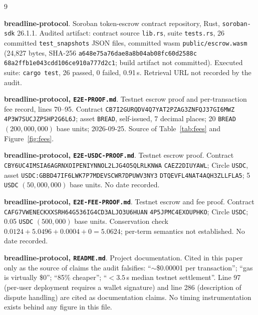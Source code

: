 \documentclass[sigconf,review]{acmart}
\begin{document}
\begin{thebibliography}{9}

  \textbf{breadline-protocol}.
  Soroban token-escrow contract repository, Rust, \texttt{soroban-sdk}
  26.1.1.
  Audited artifact: contract source \texttt{lib.rs}, suite \texttt{tests.rs},
  26 committed \texttt{test\_snapshots} JSON files, committed wasm
  \texttt{public/escrow.wasm} (24{,}827 bytes, SHA-256
  \texttt{a648e75a76dae8a8b04ab08fc60d2588c}\allowbreak
  \texttt{68a2ffb1e043cdd106ce910a777d2c1};
  build artifact not committed).
  Executed suite: \texttt{cargo test}, 26 passed, 0 failed, 0.91\,s.
  Retrieval URL not recorded by the audit.

  \textbf{breadline-protocol, \texttt{E2E-PROOF.md}}.
  Testnet escrow proof and per-transaction fee record, lines 70--95.
  Contract \texttt{CB7I2GURQDV4Q7YAT2PZAG3ZNFQJ37GI6MWZ}\allowbreak
  \texttt{4P3W7SUCJZPSHP2G6L6J};
  asset \texttt{BREAD}, self-issued, 7 decimal places; 20 \texttt{BREAD}
  $(200{,}000{,}000)$ base units; 2026-09-25.
  Source of Table~\ref{tab:fees} and Figure~\ref{fig:fees}.

  \textbf{breadline-protocol, \texttt{E2E-USDC-PROOF.md}}.
  Testnet escrow proof. Contract
  \texttt{CBY6UC4IMSIA6AGRNXOIPENIYNNOL2LJG4O5QLRLKNWA}\allowbreak
  \texttt{CAEZ2DIUYAWL};
  Circle \texttt{USDC}, asset
  \texttt{USDC:GBBD47IF6LWK7P7MDEVSCWR7DPUWV3NY3}\allowbreak
  \texttt{DTQEVFL4NAT4AQH3ZLLFLA5};
  5 \texttt{USDC} $(50{,}000{,}000)$ base units. No date recorded.

  \textbf{breadline-protocol, \texttt{E2E-FEE-PROOF.md}}.
  Testnet escrow and fee proof. Contract
  \texttt{CAFG7VWENECKXXSRH64G536IG4CD3ALJO3U6HUAN}\allowbreak
  \texttt{4P5JPMC4EXOUPHKO};
  Circle \texttt{USDC}; 0.05 \texttt{USDC} $(500{,}000)$ base units.
  Conservation check $0.0124 + 5.0496 + 0.0004 + 0 = 5.0624$; per-term
  semantics not established. No date recorded.

  \textbf{breadline-protocol, \texttt{README.md}}.
  Project documentation. Cited in this paper only as the source of claims the
  audit falsifies: ``$\sim$\$0.00001 per transaction''; ``gas is virtually
  \$0''; ``85\% cheaper''; ``$<3.5$\,s median testnet settlement''. Line 97
  (per-user deployment requires a wallet signature) and line 286 (description
  of dispute handling) are cited as documentation claims.
  No timing instrumentation exists behind any figure in this file.


\end{thebibliography}
\end{document}
